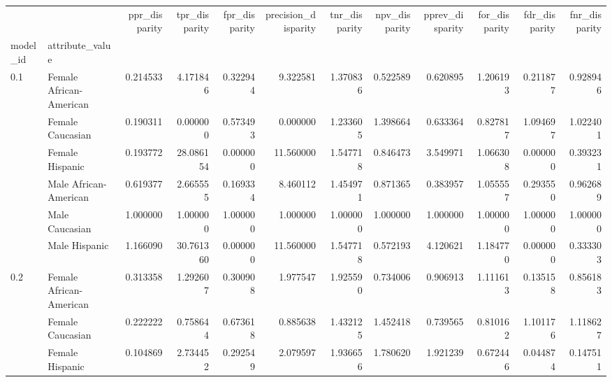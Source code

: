 \begin{tabular}{llrrrrrrrrrr}
\toprule
    &               &  ppr\_disparity &  tpr\_disparity &  fpr\_disparity &  precision\_disparity &  tnr\_disparity &  npv\_disparity &  pprev\_disparity &  for\_disparity &  fdr\_disparity &  fnr\_disparity \\
model\_id & attribute\_value &                &                &                &                      &                &                &                  &                &                &                \\
\midrule
0.1 & Female African-American &       0.214533 &       4.171846 &       0.322944 &             9.322581 &       1.370836 &       0.522589 &         0.620895 &       1.206193 &       0.211877 &       0.928946 \\
    & Female Caucasian &       0.190311 &       0.000000 &       0.573493 &             0.000000 &       1.233605 &       1.398664 &         0.633364 &       0.827817 &       1.094697 &       1.022401 \\
    & Female Hispanic &       0.193772 &      28.086154 &       0.000000 &            11.560000 &       1.547718 &       0.846473 &         3.549971 &       1.066308 &       0.000000 &       0.393231 \\
    & Male African-American &       0.619377 &       2.665555 &       0.169334 &             8.460112 &       1.454971 &       0.871365 &         0.383957 &       1.055557 &       0.293550 &       0.962689 \\
    & Male Caucasian &       1.000000 &       1.000000 &       1.000000 &             1.000000 &       1.000000 &       1.000000 &         1.000000 &       1.000000 &       1.000000 &       1.000000 \\
    & Male Hispanic &       1.166090 &      30.761360 &       0.000000 &            11.560000 &       1.547718 &       0.572193 &         4.120621 &       1.184770 &       0.000000 &       0.333303 \\
0.2 & Female African-American &       0.313358 &       1.292607 &       0.300908 &             1.977547 &       1.925590 &       0.734006 &         0.906913 &       1.111613 &       0.135158 &       0.856183 \\
    & Female Caucasian &       0.222222 &       0.758644 &       0.673618 &             0.885638 &       1.432125 &       1.452418 &         0.739565 &       0.810162 &       1.101176 &       1.118627 \\
    & Female Hispanic &       0.104869 &       2.734452 &       0.292549 &             2.079597 &       1.936656 &       1.780620 &         1.921239 &       0.672446 &       0.044874 &       0.147511 \\

\end{tabular}
